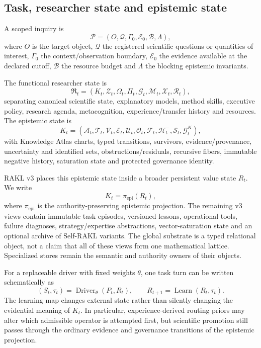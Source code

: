 \subsection{Task, researcher state and epistemic state}
A scoped inquiry is
\begin{equation}\mathcal P=(O,\mathcal Q,\Gamma_0,\mathcal E_0,\mathcal B,\Lambda),\end{equation}
where $O$ is the target object, $\mathcal Q$ the registered scientific questions or quantities of interest, $\Gamma_0$ the context/observation boundary, $\mathcal E_0$ the evidence available at the declared cutoff, $\mathcal B$ the resource budget and $\Lambda$ the blocking epistemic invariants.

The functional researcher state is
\begin{equation}\mathfrak R_t=(K_t,\mathcal Z_t,\Omega_t,\Pi_t,\mathcal G_t,\mathcal M_t,\mathcal X_t,\mathcal R_t),\end{equation}
separating canonical scientific state, explanatory models, method skills, executive policy, research agenda, metacognition, experience/transfer history and resources. The epistemic state is
\begin{equation}K_t=(\mathcal A_t,\mathcal T_t,\mathcal V_t,\mathcal E_t,\mathcal U_t,\mathcal O_t,\mathcal F_t,\mathcal H_t^{-},\mathcal S_t,\mathcal G_t^K),\end{equation}
with Knowledge Atlas charts, typed transitions, survivors, evidence/provenance, uncertainty and identified sets, obstructions/residuals, recursive fibers, immutable negative history, saturation state and protected governance identity.


RAKL v3 places this epistemic state inside a broader persistent value state $R_t$. We write
\begin{equation}
K_t=\pi_{\mathrm{epi}}(R_t),
\end{equation}
where $\pi_{\mathrm{epi}}$ is the authority-preserving epistemic projection. The remaining v3 views contain immutable task episodes, versioned lessons, operational tools, failure diagnoses, strategy/expertise abstractions, vector-saturation state and an optional archive of Self-RAKL variants. The global substrate is a typed relational object, not a claim that all of these views form one mathematical lattice. Specialized stores remain the semantic and authority owners of their objects.

For a replaceable driver with fixed weights $\theta$, one task turn can be written schematically as
\begin{equation}
(S_t,\tau_t)=\operatorname{Driver}_{\theta}(P_t,R_t),
\qquad
R_{t+1}=\operatorname{Learn}(R_t,\tau_t).
\end{equation}
The learning map changes external state rather than silently changing the evidential meaning of $K_t$. In particular, experience-derived routing priors may alter which admissible operator is attempted first, but scientific promotion still passes through the ordinary evidence and governance transitions of the epistemic projection.

